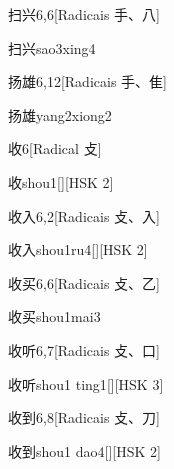 \begin{entry}{扫兴}{6,6}[Radicais ⼿、⼋]
  \begin{phonetics}{扫兴}{sao3xing4}
  \end{phonetics}
\end{entry}

\begin{entry}{扬雄}{6,12}[Radicais ⼿、⾫]
  \begin{phonetics}{扬雄}{yang2xiong2}
  \end{phonetics}
\end{entry}

\begin{entry}{收}{6}[Radical ⽁]
  \begin{phonetics}{收}{shou1}[][HSK 2]
  \end{phonetics}
\end{entry}

\begin{entry}{收入}{6,2}[Radicais ⽁、⼊]
  \begin{phonetics}{收入}{shou1ru4}[][HSK 2]
  \end{phonetics}
\end{entry}

\begin{entry}{收买}{6,6}[Radicais ⽁、⼄]
  \begin{phonetics}{收买}{shou1mai3}
  \end{phonetics}
\end{entry}

\begin{entry}{收听}{6,7}[Radicais ⽁、⼝]
  \begin{phonetics}{收听}{shou1 ting1}[][HSK 3]
  \end{phonetics}
\end{entry}

\begin{entry}{收到}{6,8}[Radicais ⽁、⼑]
  \begin{phonetics}{收到}{shou1 dao4}[][HSK 2]
  \end{phonetics}
\end{entry}

